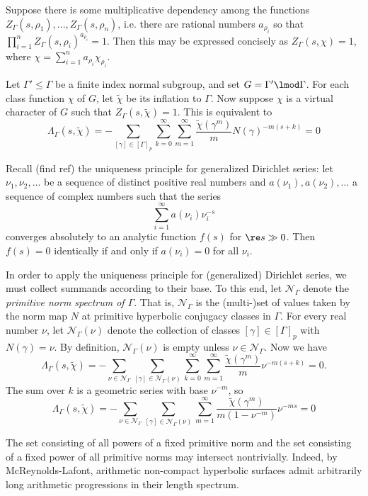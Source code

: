 \documentclass[11pt]{amsart}
\begin{document}
Suppose there is some multiplicative dependency among the functions $Z_\Gamma(s,\rho_1),...,Z_\Gamma(s,\rho_n)$, i.e.
there are rational numbers $a_{\rho_i}$ so that $\prod_{i=1}^n Z_\Gamma(s,\rho_i)^{a_{\rho_i}}=1$.
Then this may be expressed concisely as $Z_\Gamma(s,\chi)=1$, where $\chi=\sum_{i=1}^n a_{\rho_i} \chi_{\rho_i}$.

Let $\Gamma'\leq \Gamma$ be a finite index normal subgroup, and set $G=\Gamma'\lmod \Gamma$.
For each class function $\chi$ of $G$, let $\tilde{\chi}$ be its inflation to $\Gamma$.
Now suppose $\chi$ is a virtual character of $G$ such that $Z_\Gamma(s,\tilde{\chi})=1$.
This is equivalent to
\[ \Lambda_\Gamma(s,\tilde{\chi})= -\sum_{[\gamma]\in [\Gamma]_p} \sum_{k=0}^\infty\sum_{m=1}^\infty \frac{\tilde{\chi}(\gamma^m)}{m}N(\gamma)^{-m(s+k)}=0 \]

Recall (find ref) the uniqueness principle for generalized Dirichlet series: let $\nu_1, \nu_2,...$ be a sequence of distinct positive real numbers and $a(\nu_1),a(\nu_2),...$ a sequence of complex numbers such that the series
\[ \sum_{i=1}^\infty a(\nu_i)\nu_i^{-s}\]
converges absolutely to an analytic function $f(s)$ for $\re s \gg 0$.
Then $f(s)=0$ identically if and only if $a(\nu_i)=0$ for all $\nu_i$.


In order to apply the uniqueness principle for (generalized) Dirichlet series, we must collect summands according to their base.
To this end, let $\mathcal{N}_\Gamma$ denote the \emph{primitive norm spectrum of $\Gamma$}.
That is, $\mathcal{N}_\Gamma$ is the (multi-)set of values taken by the norm map $N$ at primitive hyperbolic conjugacy classes in $\Gamma$.
For every real number $\nu$, let $\mathcal{N}_\Gamma(\nu)$ denote the collection of classes $[\gamma] \in [\Gamma]_p$ with $N(\gamma)=\nu$.
By definition, $\mathcal{N}_\Gamma(\nu)$ is empty unless $\nu \in \mathcal{N}_\Gamma$.
Now we have
\[ \Lambda_\Gamma(s,\tilde{\chi})=-\sum_{\nu \in \mathcal{N}_\Gamma} \sum_{[\gamma] \in \mathcal{N}_\Gamma(\nu)} \sum_{k=0}^\infty\sum_{m=1}^\infty \frac{\tilde{\chi}(\gamma^m)}{m}\nu ^{-m(s+k)}=0.
\]
The sum over $k$ is a geometric series with base $\nu^{-m}$, so
\[ \Lambda_\Gamma(s,\tilde{\chi})=-\sum_{\nu \in \mathcal{N}_\Gamma} \sum_{[\gamma] \in \mathcal{N}_\Gamma(\nu)} \sum_{m=1}^\infty \frac{\tilde{\chi}(\gamma^m)}{m(1-\nu^{-m})}\nu ^{-ms}=0  \]

The set consisting of all powers of a fixed primitive norm and the set consisting of a fixed power of all primitive norms may intersect nontrivially.
Indeed, by McReynolds-Lafont, arithmetic non-compact hyperbolic surfaces admit arbitrarily long arithmetic progressions in their length spectrum.
\end{document}
